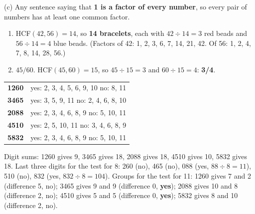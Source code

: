 \documentclass[12pt,a4paper]{article}
\begin{document}
\smallskip
\noindent (c) Any sentence saying that \textbf{1 is a factor of every number}, so every
pair of numbers has at least one common factor.

\smallskip
{}

\begin{enumerate}[label=\arabic*., itemsep=2pt]
  \item HCF$(42,56) = 14$, so \textbf{14 bracelets}, each with $42 \div 14 = 3$ red
        beads and $56 \div 14 = 4$ blue beads. (Factors of 42: 1, 2, 3, 6, 7, 14, 21,
        42. Of 56: 1, 2, 4, 7, 8, 14, 28, 56.)
  \item $45/60$. HCF$(45,60) = 15$, so $45 \div 15 = 3$ and $60 \div 15 = 4$:
        \textbf{3/4}.
\end{enumerate}

\noindent
\begin{tabularx}{\linewidth}{@{}lX@{}}
  \textbf{1260} & yes: 2, 3, 4, 5, 6, 9, 10 \quad no: 8, 11 \\
  \textbf{3465} & yes: 3, 5, 9, 11 \quad no: 2, 4, 6, 8, 10 \\
  \textbf{2088} & yes: 2, 3, 4, 6, 8, 9 \quad no: 5, 10, 11 \\
  \textbf{4510} & yes: 2, 5, 10, 11 \quad no: 3, 4, 6, 8, 9 \\
  \textbf{5832} & yes: 2, 3, 4, 6, 8, 9 \quad no: 5, 10, 11 \\
\end{tabularx}

\smallskip
\noindent Digit sums: 1260 gives 9, 3465 gives 18, 2088 gives 18, 4510 gives 10,
5832 gives 18. Last three digits for the test for 8: 260 (no), 465 (no), 088 (yes,
$88 \div 8 = 11$), 510 (no), 832 (yes, $832 \div 8 = 104$).
Groups for the test for 11: 1260 gives 7 and 2 (difference 5, no); 3465 gives 9 and 9
(difference 0, \textbf{yes}); 2088 gives 10 and 8 (difference 2, no); 4510 gives 5 and
5 (difference 0, \textbf{yes}); 5832 gives 8 and 10 (difference 2, no).
\end{document}
